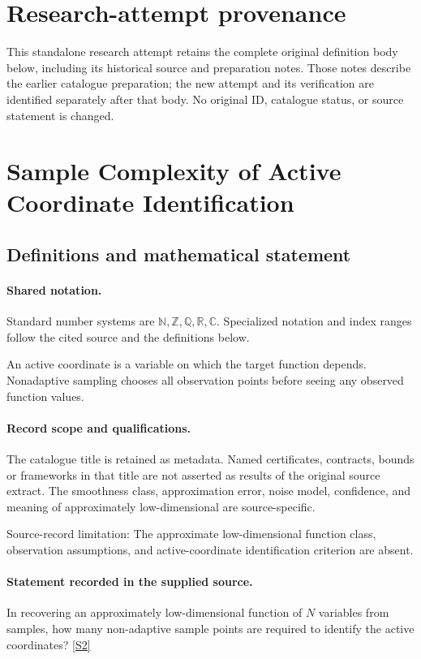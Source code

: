 \documentclass[11pt]{article}
\begin{document}
\section*{Research-attempt provenance}
This standalone research attempt retains the complete original definition body below,
including its historical source and preparation notes. Those notes describe the
earlier catalogue preparation; the new attempt and its verification are identified
separately after that body. No original ID, catalogue status, or source statement is changed.

\section{Sample Complexity of Active Coordinate Identification}\label{statement}

\subsection{Definitions and mathematical statement}

\paragraph{Shared notation.}Standard number systems are $\mathbb N,\mathbb Z,\mathbb Q,\mathbb R,\mathbb C$. Specialized notation and index ranges follow the cited source and the definitions below.


An active coordinate is a variable on which the target function depends. Nonadaptive sampling chooses all observation points before seeing any observed function values.
\paragraph{Record scope and qualifications.}
The catalogue title is retained as metadata. Named certificates, contracts, bounds or frameworks in that title are not asserted as results of the original source extract.
The smoothness class, approximation error, noise model, confidence, and meaning of approximately low-dimensional are source-specific.

Source-record limitation: The approximate low-dimensional function class, observation assumptions, and active-coordinate identification criterion are absent.
\paragraph{Statement recorded in the supplied source.}
In recovering an approximately low-dimensional function of $N$ variables from samples, how many non-adaptive sample points are required to identify the active coordinates? \href{https://doi.org/10.4171/owr/2010/33}{[S2]}
\end{document}
